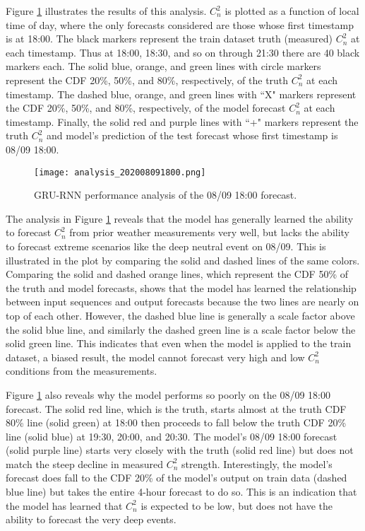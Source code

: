 Figure \ref{fig:analysis_08091800} illustrates the results of this analysis. $C_{n}^{2}$ is plotted as a function of local time of day, where the only forecasts considered are those whose first timestamp is at 18:00. The black markers represent the train dataset truth (measured) $C_{n}^{2}$ at each timestamp. Thus at 18:00, 18:30, and so on through 21:30 there are 40 black markers each. The solid blue, orange, and green lines with circle markers represent the CDF 20\%, 50\%, and 80\%, respectively, of the truth $C_{n}^{2}$ at each timestamp. The dashed blue, orange, and green lines with ``X" markers represent the CDF 20\%, 50\%, and 80\%, respectively, of the model forecast $C_{n}^{2}$ at each timestamp. Finally, the solid red and purple lines with ``+" markers represent the truth $C_{n}^{2}$ and model's prediction of the test forecast whose first timestamp is 08/09 18:00.
\begin{figure}[h!]
	\centering
	\texttt{[image: analysis\_202008091800.png]}
	\caption{GRU-RNN performance analysis of the 08/09 18:00 forecast.}
	\label{fig:analysis_08091800}
\end{figure}

The analysis in Figure \ref{fig:analysis_08091800} reveals that the model has generally learned the ability to forecast $C_{n}^{2}$ from prior weather measurements very well, but lacks the ability to forecast extreme scenarios like the deep neutral event on 08/09. This is illustrated in the plot by comparing the solid and dashed lines of the same colors. Comparing the solid and dashed orange lines, which represent the CDF 50\% of the truth and model forecasts, shows that the model has learned the relationship between input sequences and output forecasts because the two lines are nearly on top of each other. However, the dashed blue line is generally a scale factor above the solid blue line, and similarly the dashed green line is a scale factor below the solid green line. This indicates that even when the model is applied to the train dataset, a biased result, the model cannot forecast very high and low $C_{n}^{2}$ conditions from the measurements.

Figure \ref{fig:analysis_08091800} also reveals why the model performs so poorly on the 08/09 18:00 forecast. The solid red line, which is the truth, starts almost at the truth CDF 80\% line (solid green) at 18:00 then proceeds to fall below the truth CDF 20\% line (solid blue) at 19:30, 20:00, and 20:30. The model's 08/09 18:00 forecast (solid purple line) starts very closely with the truth (solid red line) but does not match the steep decline in measured $C_{n}^{2}$ strength. Interestingly, the model's forecast does fall to the CDF 20\% of the model's output on train data (dashed blue line) but takes the entire 4-hour forecast to do so. This is an indication that the model has learned that $C_{n}^{2}$ is expected to be low, but does not have the ability to forecast the very deep events.


